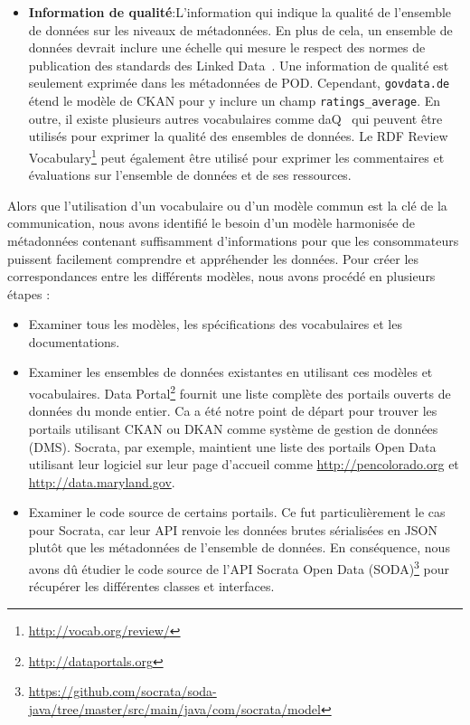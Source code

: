 \begin{itemize}
	\item \textbf{Information de qualit\'{e}}:L'information qui indique la qualit\'{e} de l'ensemble de donn\'{e}es sur les niveaux de m\'{e}tadonn\'{e}es. En plus de cela, un ensemble de donn\'{e}es devrait inclure une \'{e}chelle qui mesure le respect des normes de publication des standards des Linked Data~\cite{Berners-Lee:W3C:06}. Une information de qualit\'{e} est seulement exprim\'{e}e dans les m\'{e}tadonn\'{e}es de POD. Cependant, \texttt{govdata.de} \'{e}tend le mod\`{e}le de CKAN pour y inclure un champ \texttt{ratings\_average}. En outre, il existe plusieurs autres vocabulaires comme daQ~\cite{Debattista:WWW:14} qui peuvent être utilis\'{e}s pour exprimer la qualit\'{e} des ensembles de donn\'{e}es. Le RDF Review Vocabulary\footnote{\url{http://vocab.org/review/}} peut \'{e}galement être utilis\'{e} pour exprimer les commentaires et \'{e}valuations sur l'ensemble de donn\'{e}es et de ses ressources.
\end{itemize}

Alors que l'utilisation d'un vocabulaire ou d'un mod\`{e}le commun est la cl\'{e} de la communication, nous avons identifi\'{e} le besoin d'un mod\`{e}le harmonis\'{e}e de m\'{e}tadonn\'{e}es contenant suffisamment d'informations pour que les consommateurs puissent facilement comprendre et appr\'{e}hender les donn\'{e}es. Pour cr\'{e}er les correspondances entre les diff\'{e}rents mod\`{e}les, nous avons proc\'{e}d\'{e} en plusieurs \'{e}tapes :
\begin{itemize}
	\item Examiner tous les mod\`{e}les, les sp\'{e}cifications des vocabulaires et les documentations.
	\item Examiner les ensembles de donn\'{e}es existantes en utilisant ces mod\`{e}les et vocabulaires. Data Portal\footnote{\url{http://dataportals.org}} fournit une liste compl\`{e}te des portails ouverts de donn\'{e}es du monde entier. Ca a \'{e}t\'{e} notre point de d\'{e}part pour trouver les portails utilisant CKAN ou DKAN comme syst\`{e}me de gestion de donn\'{e}es (DMS). Socrata, par exemple, maintient une liste des portails Open Data utilisant leur logiciel sur leur page d'accueil comme \url{http://pencolorado.org} et \url{http://data.maryland.gov}.
	\item Examiner le code source de certains portails. Ce fut particuli\`{e}rement le cas pour Socrata, car leur API renvoie les donn\'{e}es brutes s\'{e}rialis\'{e}es en JSON plutôt que les m\'{e}tadonn\'{e}es de l'ensemble de donn\'{e}es. En cons\'{e}quence, nous avons dû \'{e}tudier le code source de l'API Socrata Open Data (SODA)\footnote{\url{https://github.com/socrata/soda-java/tree/master/src/main/java/com/socrata/model}} pour r\'{e}cup\'{e}rer les diff\'{e}rentes classes et interfaces.
\end{itemize}

